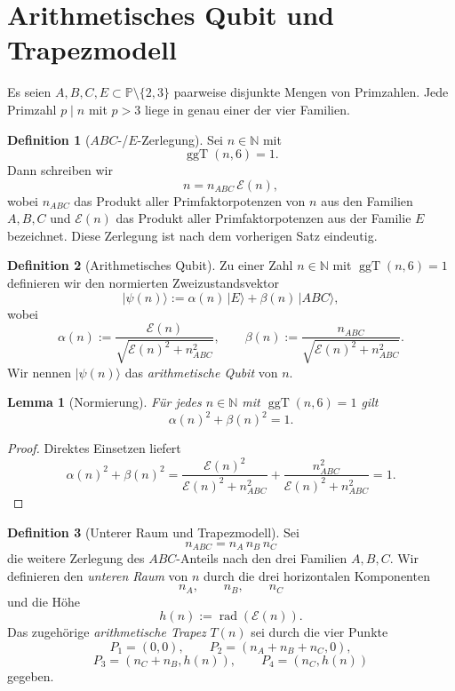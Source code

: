 \documentclass[11pt,a4paper]{article}
\newtheorem{lemma}{Lemma}
\theoremstyle{definition}
\newtheorem{definition}{Definition}
\DeclareMathOperator{\ggT}{ggT}
\DeclareMathOperator{\rad}{rad}
\begin{document}
 	
 	\section{Arithmetisches Qubit und Trapezmodell}
 	
 	Es seien $A,B,C,E\subset\mathbb{P}\setminus\{2,3\}$ paarweise disjunkte Mengen von Primzahlen. Jede Primzahl $p\mid n$ mit $p>3$ liege in genau einer der vier Familien.
 	
 	\begin{definition}[$ABC$-/$E$-Zerlegung]
 		Sei $n\in\mathbb{N}$ mit
 		\[
 		\ggT(n,6)=1.
 		\]
 		Dann schreiben wir
 		\[
 		n=n_{ABC}\,\mathcal E(n),
 		\]
 		wobei $n_{ABC}$ das Produkt aller Primfaktorpotenzen von $n$ aus den Familien
 		$A,B,C$ und $\mathcal E(n)$ das Produkt aller Primfaktorpotenzen aus der Familie $E$ bezeichnet.
 		Diese Zerlegung ist nach dem vorherigen Satz eindeutig.
 	\end{definition}
 	
 	\begin{definition}[Arithmetisches Qubit]
 		Zu einer Zahl $n\in\mathbb{N}$ mit $\ggT(n,6)=1$ definieren wir den normierten Zweizustandsvektor
 		\[
 		|\psi(n)\rangle
 		:=
 		\alpha(n)\,|E\rangle+\beta(n)\,|ABC\rangle,
 		\]
 		wobei
 		\[
 		\alpha(n):=\frac{\mathcal E(n)}{\sqrt{\mathcal E(n)^2+n_{ABC}^2}},
 		\qquad
 		\beta(n):=\frac{n_{ABC}}{\sqrt{\mathcal E(n)^2+n_{ABC}^2}}.
 		\]
 		Wir nennen $|\psi(n)\rangle$ das \emph{arithmetische Qubit} von $n$.
 	\end{definition}
 	
 	\begin{lemma}[Normierung]
 		Für jedes $n\in\mathbb{N}$ mit $\ggT(n,6)=1$ gilt
 		\[
 		\alpha(n)^2+\beta(n)^2=1.
 		\]
 	\end{lemma}
 	
 	\begin{proof}
 		Direktes Einsetzen liefert
 		\[
 		\alpha(n)^2+\beta(n)^2
 		=
 		\frac{\mathcal E(n)^2}{\mathcal E(n)^2+n_{ABC}^2}
 		+
 		\frac{n_{ABC}^2}{\mathcal E(n)^2+n_{ABC}^2}
 		=1.
 		\]
 	\end{proof}
 	
 	\begin{definition}[Unterer Raum und Trapezmodell]
 		Sei
 		\[
 		n_{ABC}=n_A\,n_B\,n_C
 		\]
 		die weitere Zerlegung des $ABC$-Anteils nach den drei Familien $A,B,C$.
 		Wir definieren den \emph{unteren Raum} von $n$ durch die drei horizontalen Komponenten
 		\[
 		n_A,\qquad n_B,\qquad n_C
 		\]
 		und die Höhe
 		\[
 		h(n):=\rad(\mathcal E(n)).
 		\]
 		Das zugehörige \emph{arithmetische Trapez} $T(n)$ sei durch die vier Punkte
 		\[
 		P_1=(0,0),\qquad
 		P_2=(n_A+n_B+n_C,0),
 		\]
 		\[
 		P_3=(n_C+n_B,h(n)),\qquad
 		P_4=(n_C,h(n))
 		\]
 		gegeben.
 	\end{definition}
 	
\end{document}
